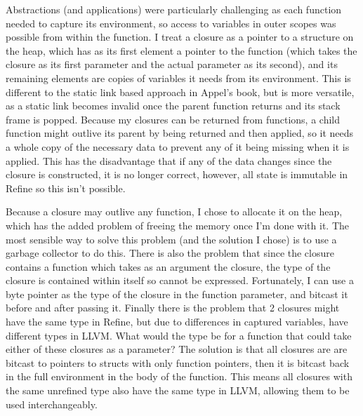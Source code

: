 Abstractions (and applications) were particularly challenging as each function needed to capture its
environment, so access to variables in outer scopes was possible from within the function.
I treat a closure as a pointer to a structure on the heap, which has as its first element a pointer
to the function (which takes the closure as its first parameter and the actual parameter as its second),
and its remaining elements are copies of variables it needs from its environment.
This is different to the static link based approach in Appel's book, but is more versatile, as a
static link becomes invalid once the parent function returns and its stack frame is popped.
Because my closures can be returned from functions, a child function might outlive its parent by being
returned and then applied, so it needs a whole copy of the necessary data to prevent any of it being
missing when it is applied.
This has the disadvantage that if any of the data changes since the closure is constructed, it is no longer
correct, however, all state is immutable in Refine so this isn't possible.

Because a closure may outlive any function, I chose to allocate it on the heap, which has the added problem
of freeing the memory once I'm done with it.
The most sensible way to solve this problem (and the solution I chose) is to use a garbage collector to do this.
There is also the problem that since the closure contains a function which takes as an argument the closure,
the type of the closure is contained within itself so cannot be expressed.
Fortunately, I can use a byte pointer as the type of the closure in the function parameter, and bitcast it
before and after passing it.
Finally there is the problem that 2 closures might have the same type in Refine, but due to differences
in captured variables, have different types in LLVM.
What would the type be for a function that could take either of these closures as a parameter?
The solution is that all closures are are bitcast to pointers to structs with only function pointers,
then it is bitcast back in the full environment in the body of the function.
This means all closures with the same unrefined type also have the same type in LLVM, allowing them
to be used interchangeably.

